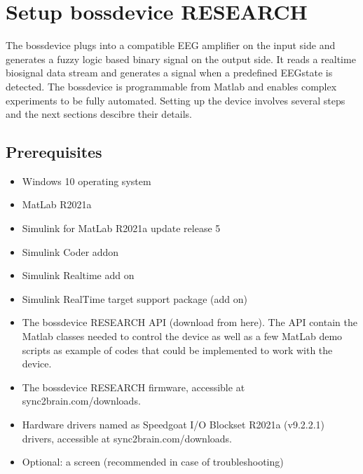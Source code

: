 \documentclass[letterpaper,10pt,english]{sphinxmanual}
\begin{document}
\chapter{Setup bossdevice RESEARCH}
\label{\detokenize{2_setup_bossdevice_research:setup-bossdevice-research}}\label{\detokenize{2_setup_bossdevice_research::doc}}
\sphinxAtStartPar
The bossdevice plugs into a compatible EEG amplifier on the input side and generates a fuzzy logic based binary signal on the output side. It reads a real\sphinxhyphen{}time biosignal data stream and generates a  signal when a pre\sphinxhyphen{}defined EEG\sphinxhyphen{}state is detected. The bossdevice is programmable from Matlab and enables complex experiments to be fully automated. Setting up the device involves several steps and the next sections descibre their details.


\section{Pre\sphinxhyphen{}requisites}
\label{\detokenize{2_setup_bossdevice_research:pre-requisites}}\begin{itemize}
\item {} 
\sphinxAtStartPar
Windows 10 operating system

\item {} 
\sphinxAtStartPar
MatLab R2021a

\item {} 
\sphinxAtStartPar
Simulink for MatLab R2021a update release 5

\item {} 
\sphinxAtStartPar
Simulink Coder add\sphinxhyphen{}on

\item {} 
\sphinxAtStartPar
Simulink Real\sphinxhyphen{}time add on

\item {} 
\sphinxAtStartPar
Simulink Real\sphinxhyphen{}Time target support package (add on)

\item {} 
\sphinxAtStartPar
The bossdevice RESEARCH API (download from here). The API contain the Matlab classes needed to control the device as well as a few MatLab demo scripts as example of codes that could be implemented to work with the device.

\item {} 
\sphinxAtStartPar
The bossdevice RESEARCH firmware, accessible at sync2brain.com/downloads.

\item {} 
\sphinxAtStartPar
Hardware drivers named as Speedgoat I/O Blockset R2021a (v9.2.2.1) drivers, accessible at sync2brain.com/downloads.

\item {} 
\sphinxAtStartPar
Optional: a screen (recommended in case of troubleshooting)

\end{itemize}
\end{document}
